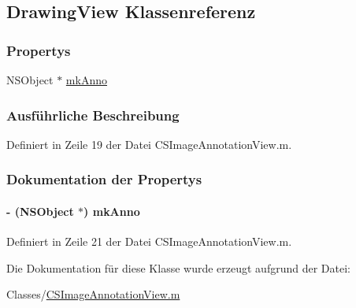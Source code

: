 \hypertarget{interface_drawing_view}{
\subsection{DrawingView Klassenreferenz}
\label{interface_drawing_view}
}
\subsubsection*{Propertys}
\begin{DoxyCompactItemize}
\item 
NSObject $\ast$ \hyperlink{interface_drawing_view_a7d91cc3bf9915df58fbd1aaac030869d}{mkAnno}
\end{DoxyCompactItemize}


\subsubsection{Ausführliche Beschreibung}


Definiert in Zeile 19 der Datei CSImageAnnotationView.m.

\subsubsection{Dokumentation der Propertys}
\hypertarget{interface_drawing_view_a7d91cc3bf9915df58fbd1aaac030869d}{
\paragraph[{mkAnno}]{\setlength{\rightskip}{0pt plus 5cm}-\/ (NSObject $\ast$) mkAnno}\hfill}
\label{interface_drawing_view_a7d91cc3bf9915df58fbd1aaac030869d}


Definiert in Zeile 21 der Datei CSImageAnnotationView.m.

Die Dokumentation für diese Klasse wurde erzeugt aufgrund der Datei:\begin{DoxyCompactItemize}
\item 
Classes/\hyperlink{_c_s_image_annotation_view_8m}{CSImageAnnotationView.m}\end{DoxyCompactItemize}
